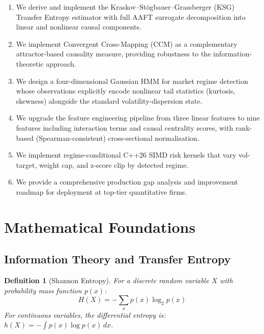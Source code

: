 \documentclass[12pt,a4paper]{article}
\newtheorem{definition}[theorem]{Definition}
\begin{document}
\begin{enumerate}[leftmargin=2em]
    \item We derive and implement the Kraskov--Stögbauer--Grassberger (KSG)
          Transfer Entropy estimator with full AAFT surrogate decomposition into
          linear and nonlinear causal components.

    \item We implement Convergent Cross-Mapping (CCM) as a complementary
          attractor-based causality measure, providing robustness to the
          information-theoretic approach.

    \item We design a four-dimensional Gaussian HMM for market regime detection
          whose observations explicitly encode nonlinear tail statistics (kurtosis,
          skewness) alongside the standard volatility-dispersion state.

    \item We upgrade the feature engineering pipeline from three linear features
          to nine features including interaction terms and causal centrality scores,
          with rank-based (Spearman-consistent) cross-sectional normalisation.

    \item We implement regime-conditional C++26 SIMD risk kernels that vary
          vol-target, weight cap, and z-score clip by detected regime.

    \item We provide a comprehensive production gap analysis and improvement
          roadmap for deployment at top-tier quantitative firms.
\end{enumerate}

\section{Mathematical Foundations}

\subsection{Information Theory and Transfer Entropy}

\begin{definition}[Shannon Entropy]
For a discrete random variable $X$ with probability mass function $p(x)$:
\begin{equation}
    H(X) = -\sum_{x} p(x) \log_2 p(x)
\end{equation}
For continuous variables, the differential entropy is:
$h(X) = -\int p(x)\log p(x)\,dx$.
\end{definition}
\end{document}
